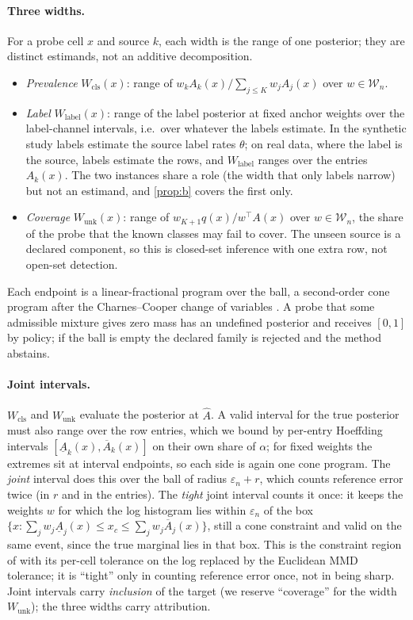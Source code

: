 \documentclass[twoside]{article}
\newcommand{\Wcls}{\ensuremath{W_{\mathrm{cls}}}}
\newcommand{\Wlab}{\ensuremath{W_{\mathrm{label}}}}
\newcommand{\Wunk}{\ensuremath{W_{\mathrm{unk}}}}
\begin{document}
\paragraph{Three widths.} For a probe cell $x$ and source $k$, each width is the range of one
posterior; they are distinct estimands, not an additive decomposition.
\begin{itemize}
\item \emph{Prevalence} $\Wcls(x)$: range of $w_kA_k(x)/\sum_{j\le K}w_jA_j(x)$ over $w\in\mathcal W_n$.
\item \emph{Label} $\Wlab(x)$: range of the label posterior at fixed anchor weights over the
label-channel intervals, i.e.\ over whatever the labels estimate. In the synthetic study labels
estimate the source label rates $\theta$; on real data, where the label is the source, labels
estimate the rows, and $\Wlab$ ranges over the entries $A_k(x)$. The two instances share a role
(the width that only labels narrow) but not an estimand, and \cref{prop:b} covers the first only.
\item \emph{Coverage} $\Wunk(x)$: range of $w_{K+1}q(x)/w^{\top}A(x)$ over $w\in\mathcal W_n$, the
share of the probe that the known classes may fail to cover. The unseen source is a declared
component, so this is closed-set inference with one extra row, not open-set detection.
\end{itemize}
Each endpoint is a linear-fractional program over the ball, a second-order cone program after the
Charnes--Cooper change of variables \citep{charnes1962programming}. A probe that some admissible
mixture gives zero mass has an undefined posterior and receives $[0,1]$ by policy; if the ball is
empty the declared family is rejected and the method abstains.

\paragraph{Joint intervals.} $\Wcls$ and $\Wunk$ evaluate the posterior at $\hat A$. A valid interval
for the true posterior must also range over the row entries, which we bound by per-entry Hoeffding
intervals $[\underline A_k(x),\overline A_k(x)]$ on their own share of $\alpha$; for fixed weights the
extremes sit at interval endpoints, so each side is again one cone program. The \emph{joint} interval
does this over the ball of radius $\varepsilon_n+r$, which counts reference error twice (in $r$ and in
the entries). The \emph{tight} joint interval counts it once: it keeps the weights $w$ for which the log
histogram lies within $\varepsilon_n$ of the box $\{x:\sum_jw_j\underline A_j(x)\le x_c\le\sum_jw_j\overline
A_j(x)\}$, still a cone constraint and valid on the same event, since the true marginal lies in that box.
This is the constraint region of \citet{li2026matrix} with its per-cell tolerance on the log replaced by
the Euclidean MMD tolerance; it is ``tight'' only in counting reference error once, not in being sharp.
Joint intervals carry \emph{inclusion} of the target (we reserve ``coverage'' for the width $\Wunk$);
the three widths carry attribution.
\end{document}
